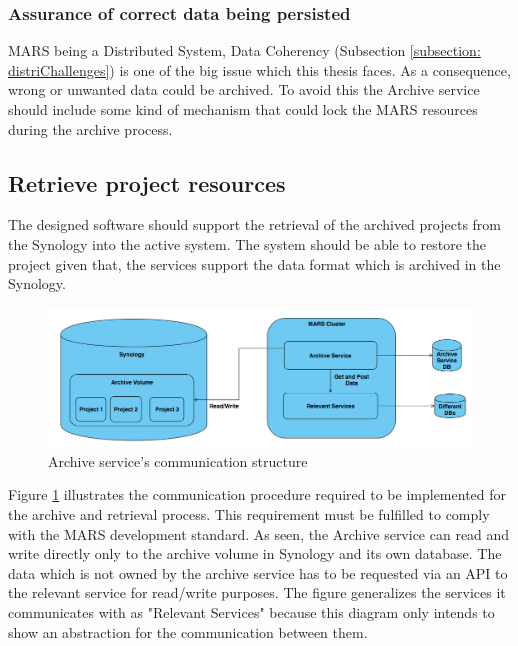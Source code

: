         \subsubsection{Assurance of correct data being persisted}
            MARS being a Distributed System, Data Coherency (Subsection \ref{subsection: distriChallenges}) 
            is one of the big issue which this thesis faces. As a consequence,
            wrong or unwanted data could be archived. To avoid this the Archive service should include some kind of mechanism that
            could lock the MARS resources during the archive process.
        
        \subsection{Retrieve project resources}    
            The designed software should support the retrieval of the archived projects from the Synology into the active system. The
            system should be able to restore the project given that, the services support the data format which is archived in the Synology.
           
            \begin{figure}[H]
                \centering \includegraphics[scale=0.4]{grafiken/synology.png}
                \caption{Archive service's communication structure}
                \label{fig:synology}
            \end{figure}

            Figure \ref{fig:synology} illustrates the communication procedure required to be implemented for the archive and retrieval process. 
            This requirement must be fulfilled to comply with the MARS development standard. As seen, the
            Archive service can read and write directly only to the archive volume in Synology and its own database. The data which is not owned by the archive
            service has to be requested via an API to the relevant service for read/write purposes. The figure generalizes the services it communicates with
            as "Relevant Services" because this diagram only intends to show an abstraction for the communication between them.


